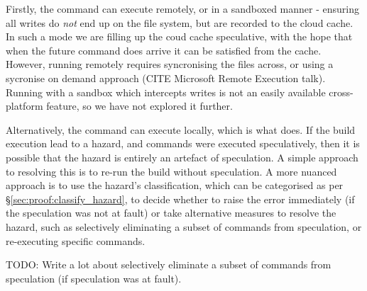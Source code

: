 Firstly, the command can execute remotely, or in a sandboxed manner - ensuring all writes do \emph{not} end up on the file system, but are recorded to the cloud cache. In such a mode we are filling up the coud cache speculative, with the hope that when the future command does arrive it can be satisfied from the cache. However, running remotely requires syncronising the files across, or using a sycronise on demand approach (CITE Microsoft Remote Execution talk). Running with a sandbox which intercepts writes is not an easily available cross-platform feature, so we have not explored it further.

Alternatively, the command can execute locally, which is what \Rattle does. If the build execution lead to a hazard, and commands were executed speculatively, then it is possible that the hazard is entirely an artefact of speculation.  A simple approach to resolving this is to re-run the build without speculation.  A more nuanced approach is to use the hazard's classification, which can be categorised as per \S\ref{sec:proof:classify_hazard}, to decide whether to raise the error immediately (if the speculation was not at fault) or take alternative measures to resolve the hazard, such as selectively eliminating a subset of commands from speculation, or re-executing specific commands.

TODO: Write a lot about selectively eliminate a subset of commands from speculation (if speculation was at fault).
